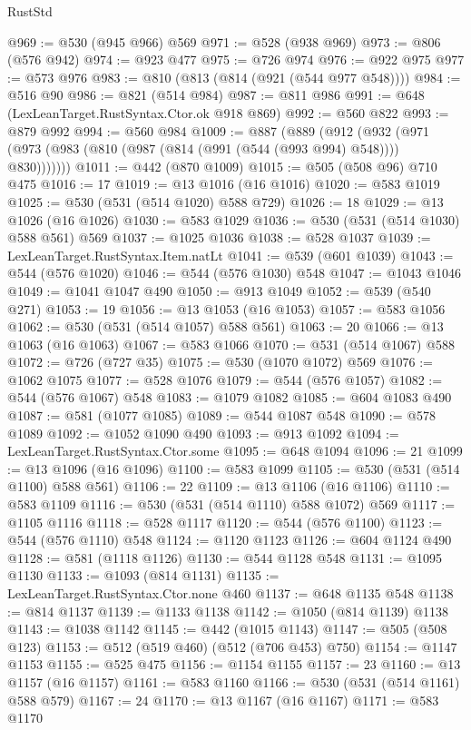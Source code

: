 \begin{lexlean}{RustStd}
\begin{coremodule}
@969 := @530 (@945 @966) @569
@971 := @528 (@938 @969)
@973 := @806 (@576 @942)
@974 := @923 @477
@975 := @726 @974
@976 := @922 @975
@977 := @573 @976
@983 := @810 (@813 (@814 (@921 (@544 @977 @548))))
@984 := @516 @90
@986 := @821 (@514 @984)
@987 := @811 @986
@991 := @648 (LexLeanTarget.RustSyntax.Ctor.ok @918 @869)
@992 := @560 @822
@993 := @879 @992
@994 := @560 @984
@1009 := @887
    (@889
      (@912 (@932 (@971 (@973 (@983 (@810 (@987 (@814 (@991 (@544 (@993 @994) @548)))) @830)))))))
@1011 := @442 (@870 @1009)
@1015 := @505 (@508 @96) @710 @475
@1016 := 17
@1019 := @13 @1016 (@16 @1016)
@1020 := @583 @1019
@1025 := @530 (@531 (@514 @1020) @588 @729)
@1026 := 18
@1029 := @13 @1026 (@16 @1026)
@1030 := @583 @1029
@1036 := @530 (@531 (@514 @1030) @588 @561) @569
@1037 := @1025 @1036
@1038 := @528 @1037
@1039 := LexLeanTarget.RustSyntax.Item.natLt
@1041 := @539 (@601 @1039)
@1043 := @544 (@576 @1020)
@1046 := @544 (@576 @1030) @548
@1047 := @1043 @1046
@1049 := @1041 @1047 @490
@1050 := @913 @1049
@1052 := @539 (@540 @271)
@1053 := 19
@1056 := @13 @1053 (@16 @1053)
@1057 := @583 @1056
@1062 := @530 (@531 (@514 @1057) @588 @561)
@1063 := 20
@1066 := @13 @1063 (@16 @1063)
@1067 := @583 @1066
@1070 := @531 (@514 @1067) @588
@1072 := @726 (@727 @35)
@1075 := @530 (@1070 @1072) @569
@1076 := @1062 @1075
@1077 := @528 @1076
@1079 := @544 (@576 @1057)
@1082 := @544 (@576 @1067) @548
@1083 := @1079 @1082
@1085 := @604 @1083 @490
@1087 := @581 (@1077 @1085)
@1089 := @544 @1087 @548
@1090 := @578 @1089
@1092 := @1052 @1090 @490
@1093 := @913 @1092
@1094 := LexLeanTarget.RustSyntax.Ctor.some
@1095 := @648 @1094
@1096 := 21
@1099 := @13 @1096 (@16 @1096)
@1100 := @583 @1099
@1105 := @530 (@531 (@514 @1100) @588 @561)
@1106 := 22
@1109 := @13 @1106 (@16 @1106)
@1110 := @583 @1109
@1116 := @530 (@531 (@514 @1110) @588 @1072) @569
@1117 := @1105 @1116
@1118 := @528 @1117
@1120 := @544 (@576 @1100)
@1123 := @544 (@576 @1110) @548
@1124 := @1120 @1123
@1126 := @604 @1124 @490
@1128 := @581 (@1118 @1126)
@1130 := @544 @1128 @548
@1131 := @1095 @1130
@1133 := @1093 (@814 @1131)
@1135 := LexLeanTarget.RustSyntax.Ctor.none @460
@1137 := @648 @1135 @548
@1138 := @814 @1137
@1139 := @1133 @1138
@1142 := @1050 (@814 @1139) @1138
@1143 := @1038 @1142
@1145 := @442 (@1015 @1143)
@1147 := @505 (@508 @123)
@1153 := @512 (@519 @460) (@512 (@706 @453) @750)
@1154 := @1147 @1153
@1155 := @525 @475
@1156 := @1154 @1155
@1157 := 23
@1160 := @13 @1157 (@16 @1157)
@1161 := @583 @1160
@1166 := @530 (@531 (@514 @1161) @588 @579)
@1167 := 24
@1170 := @13 @1167 (@16 @1167)
@1171 := @583 @1170

\end{coremodule}
\end{lexlean}
